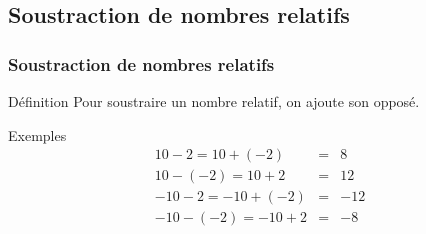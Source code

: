 \documentclass{beamer}
\begin{document}
\subsection{Soustraction de nombres relatifs}
\begin{frame}
  \frametitle{Soustraction de nombres relatifs}
  
  \begin{alertblock}{Définition}	
    Pour soustraire un nombre relatif, on ajoute son opposé.
  \end{alertblock}
  
  \begin{exampleblock}{Exemples}	
    \begin{eqnarray*}
      10 - 2    = 10 + (-2) &=&  8\\
      10 - (-2) = 10 + 2    &=& 12\\
      -10 - 2    =-10 + (-2) &=&-12\\
      -10 - (-2) =-10 + 2    &=&-8
    \end{eqnarray*}
  \end{exampleblock}
  
\end{frame}
\end{document}
